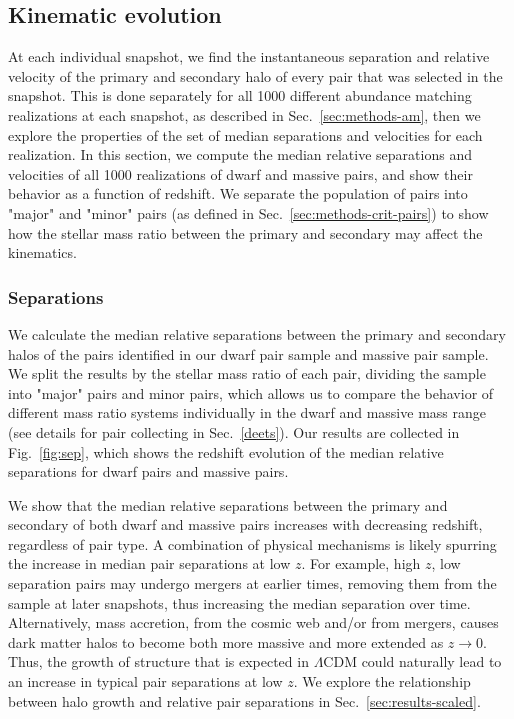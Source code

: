 \documentclass[twocolumn]{aastex631}
\begin{document}
\subsection{Kinematic evolution}\label{sec:results-kinematics}
At each individual snapshot, we find the instantaneous separation and relative velocity of the primary and secondary halo of every pair that was selected in the snapshot. 
This is done separately for all 1000 different abundance matching realizations at each snapshot, as described in Sec.~\ref{sec:methods-am}, then we explore the properties of the set of median separations and velocities for each realization. 
In this section, we compute the median relative separations and velocities of all 1000 realizations of dwarf and massive pairs, and show their behavior as a function of redshift.
We separate the population of pairs into "major" and "minor" pairs (as defined in Sec.~\ref{sec:methods-crit-pairs}) to show how the stellar mass ratio between the primary and secondary may affect the kinematics. 


    \subsubsection{Separations}
    We calculate the median relative separations between the primary and secondary halos of the pairs identified in our dwarf pair sample and massive pair sample. 
    We split the results by the stellar mass ratio of each pair, dividing the sample into "major" pairs and minor pairs, which allows us to compare the behavior of different mass ratio systems individually in the dwarf and massive mass range (see details for pair collecting in Sec.~\ref{deets}).
    Our results are collected in Fig.~\ref{fig:sep}, which shows the redshift evolution of the median relative separations for dwarf pairs and massive pairs. 
    
    We show that the median relative separations between the primary and secondary of both dwarf and massive pairs increases with decreasing redshift, regardless of pair type. 
    A combination of physical mechanisms is likely spurring the increase in median pair separations at low $z$. 
    For example, high $z$, low separation pairs may undergo mergers at earlier times, removing them from the sample at later snapshots, thus increasing the median separation over time. 
    Alternatively, mass accretion, from the cosmic web and/or from mergers, causes dark matter halos to become both more massive and more extended as $z\to0$. 
    Thus, the growth of structure that is expected in $\Lambda$CDM could naturally lead to an increase in typical pair separations at low $z$.
    We explore the relationship between halo growth and relative pair separations in Sec.~\ref{sec:results-scaled}.
    
\end{document}
